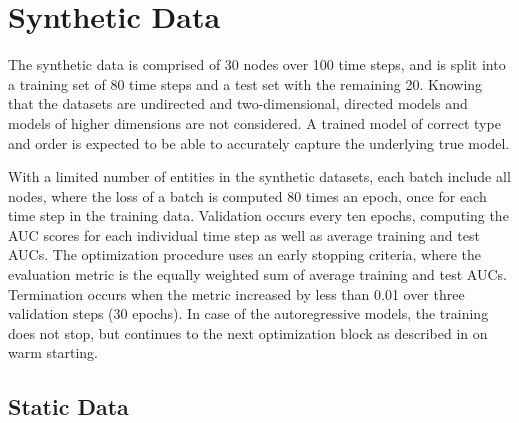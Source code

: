 \section{Synthetic Data}

    The synthetic data is comprised of 30 nodes over 100 time steps, and is split into a training set of 80 time steps and a test set with the remaining 20. Knowing that the datasets are undirected and two-dimensional, directed models and models of higher dimensions are not considered. A trained model of correct type and order is expected to be able to accurately capture the underlying true model.
    
    With a limited number of entities in the synthetic datasets, each batch include all nodes, where the loss of a batch is computed 80 times an epoch, once for each time step in the training data. Validation occurs every ten epochs, computing the AUC scores for each individual time step as well as average training and test AUCs.
    The optimization procedure uses an early stopping criteria, where the evaluation metric is the equally weighted sum of average training and test AUCs. Termination occurs when the metric increased by less than 0.01 over three validation steps (30 epochs). In case of the autoregressive models, the training does not stop, but continues to the next optimization block as described in  on warm starting.
    
    

    \subsection{Static Data}
    
